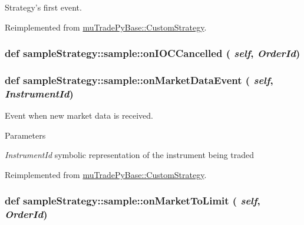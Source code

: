 Strategy's first event. 

Reimplemented from \hyperlink{classmuTradePyBase_1_1CustomStrategy_a8accc7202088d5163a9bffa940961713}{muTradePyBase::CustomStrategy}.\hypertarget{classsampleStrategy_1_1sample_a6f7c61fc31347e89aa9a0e5b130abc9d}{
\subsubsection[{onIOCCancelled}]{\setlength{\rightskip}{0pt plus 5cm}def sampleStrategy::sample::onIOCCancelled ( {\em self}, \/   {\em OrderId})}}
\label{classsampleStrategy_1_1sample_a6f7c61fc31347e89aa9a0e5b130abc9d}
\hypertarget{classsampleStrategy_1_1sample_a3295ea611070075a0b28065e0d60cd4c}{
\subsubsection[{onMarketDataEvent}]{\setlength{\rightskip}{0pt plus 5cm}def sampleStrategy::sample::onMarketDataEvent ( {\em self}, \/   {\em InstrumentId})}}
\label{classsampleStrategy_1_1sample_a3295ea611070075a0b28065e0d60cd4c}


Event when new market data is received. 
\begin{DoxyParams}{Parameters}
\item[{\em InstrumentId}]symbolic representation of the instrument being traded \end{DoxyParams}


Reimplemented from \hyperlink{classmuTradePyBase_1_1CustomStrategy_aea61c58829beb5f5e4bfa3355da9a23b}{muTradePyBase::CustomStrategy}.\hypertarget{classsampleStrategy_1_1sample_a0dadfb1a2a74b910362bfeb1d5564185}{
\subsubsection[{onMarketToLimit}]{\setlength{\rightskip}{0pt plus 5cm}def sampleStrategy::sample::onMarketToLimit ( {\em self}, \/   {\em OrderId})}}
\label{classsampleStrategy_1_1sample_a0dadfb1a2a74b910362bfeb1d5564185}


